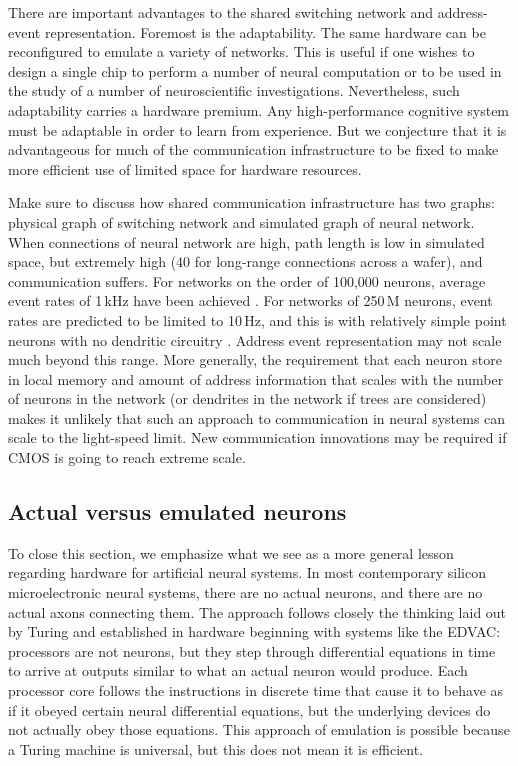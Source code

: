 \documentclass[twocolumn]{article}
\begin{document}
There are important advantages to the shared switching network and address-event representation. Foremost is the adaptability. The same hardware can be reconfigured to emulate a variety of networks. This is useful if one wishes to design a single chip to perform a number of neural computation or to be used in the study of a number of neuroscientific investigations. Nevertheless, such adaptability carries a hardware premium. Any high-performance cognitive system must be adaptable in order to learn from experience. But we conjecture that it is advantageous for much of the communication infrastructure to be fixed to make more efficient use of limited space for hardware resources.

\vspace{3em}
Make sure to discuss how shared communication infrastructure has two graphs: physical graph of switching network and simulated graph of neural network. When connections of neural network are high, path length is low in simulated space, but extremely high (40 for long-range connections across a wafer), and communication suffers. For networks on the order of 100,000 neurons, average event rates of 1\,kHz have been achieved \cite{payu2017}. For networks of 250\,M neurons, event rates are predicted to be limited to 10\,Hz, and this is with relatively simple point neurons with no dendritic circuitry \cite{kuwa2017}. Address event representation may not scale much beyond this range. More generally, the requirement that each neuron store in local memory and amount of address information that scales with the number of neurons in the network (or dendrites in the network if trees are considered) makes it unlikely that such an approach to communication in neural systems can scale to the light-speed limit. New communication innovations may be required if CMOS is going to reach extreme scale.

\subsection{Actual versus emulated neurons}
To close this section, we emphasize what we see as a more general lesson regarding hardware for artificial neural systems. In most contemporary silicon microelectronic neural systems, there are no actual neurons, and there are no actual axons connecting them. The approach follows closely the thinking laid out by Turing and established in hardware beginning with systems like the EDVAC: processors are not neurons, but they step through differential equations in time to arrive at outputs similar to what an actual neuron would produce. Each processor core follows the instructions in discrete time that cause it to behave as if it obeyed certain neural differential equations, but the underlying devices do not actually obey those equations. This approach of emulation is possible because a Turing machine is universal, but this does not mean it is efficient. 
\end{document}

